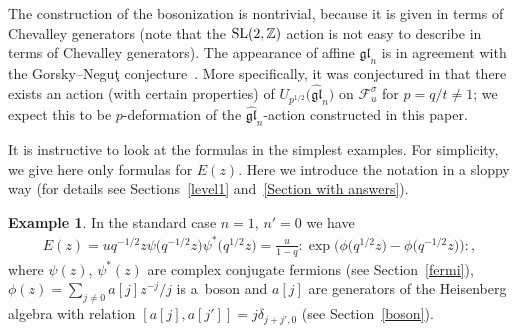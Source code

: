 \documentclass[pdftex]{sigma}
\numberwithin{equation}{section}
\theoremstyle{definition}
\newtheorem{Example}[Theorem]{Example}
\begin{document}
The construction of the bosonization is nontrivial, because it is given in terms of Chevalley generators (note that the ${\rm SL}(2,\mathbb{Z})$ action is not easy to describe in terms of Chevalley generators). The appearance of affine $\mathfrak{gl}_n$ is in agreement with the Gorsky--Negu\c{t} conjecture~\cite{GN15}. More specifically, it was conjectured in \cite{GN15} that there exists an action (with certain properties) of $U_{p^{1/2}} \big(\widehat{\mathfrak{gl}}_n\big)$ on $\mathcal{F}_u^{\sigma}$ for $p=q/t\neq1$; we expect this to be $p$-deformation of the $\widehat{\mathfrak{gl}}_n$-action constructed in this paper.

It is instructive to look at the formulas in the simplest examples. For simplicity, we give here only formulas for $E(z)$. Here we introduce the notation in a sloppy way (for details see Sections~\ref{level1} and~\ref{Section with answers}).

\begin{Example}
In the standard case $n=1$, $n'=0$ we have
\begin{gather*}
E(z) =u q^{-1/2} z \psi\big( q^{-1/2} z\big) \psi^* \big( q^{1/2} z\big)= \frac{u}{1-q}: \! \exp \big( \phi\big(q^{1/2} z\big) - \phi\big(q^{-1/2} z\big) \big) \! :,
\end{gather*}
where $\psi(z)$, $\psi^*(z)$ are complex conjugate fermions (see Section~\ref{fermi}), $\phi(z)=\sum\limits_{j \neq 0} a [j] z^{-j}/j$ is a~boson and $a[j]$ are generators of the Heisenberg algebra with relation $[a[j],a[j']]=j\delta_{j+j',0}$ (see Section~\ref{boson}).
\end{Example}
\end{document}

